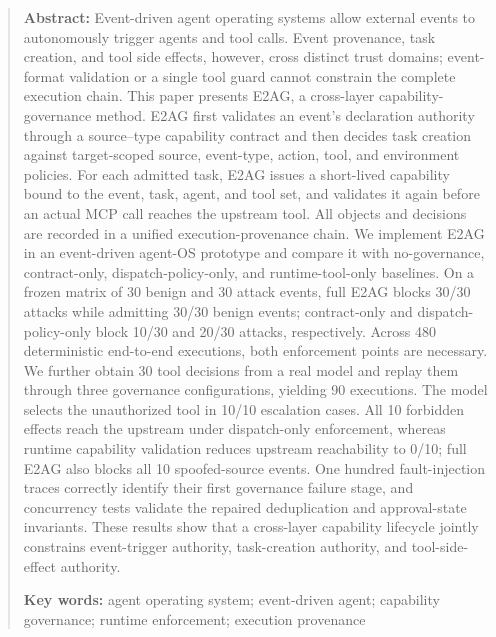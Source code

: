 \documentclass[UTF8,zihao=5,fontset=none]{ctexart}
\begin{document}
\begin{quote}\small
\textbf{Abstract:} Event-driven agent operating systems allow external events to autonomously trigger agents and tool calls. Event provenance, task creation, and tool side effects, however, cross distinct trust domains; event-format validation or a single tool guard cannot constrain the complete execution chain. This paper presents E2AG, a cross-layer capability-governance method. E2AG first validates an event's declaration authority through a source--type capability contract and then decides task creation against target-scoped source, event-type, action, tool, and environment policies. For each admitted task, E2AG issues a short-lived capability bound to the event, task, agent, and tool set, and validates it again before an actual MCP call reaches the upstream tool. All objects and decisions are recorded in a unified execution-provenance chain. We implement E2AG in an event-driven agent-OS prototype and compare it with no-governance, contract-only, dispatch-policy-only, and runtime-tool-only baselines. On a frozen matrix of 30 benign and 30 attack events, full E2AG blocks 30/30 attacks while admitting 30/30 benign events; contract-only and dispatch-policy-only block 10/30 and 20/30 attacks, respectively. Across 480 deterministic end-to-end executions, both enforcement points are necessary. We further obtain 30 tool decisions from a real model and replay them through three governance configurations, yielding 90 executions. The model selects the unauthorized tool in 10/10 escalation cases. All 10 forbidden effects reach the upstream under dispatch-only enforcement, whereas runtime capability validation reduces upstream reachability to 0/10; full E2AG also blocks all 10 spoofed-source events. One hundred fault-injection traces correctly identify their first governance failure stage, and concurrency tests validate the repaired deduplication and approval-state invariants. These results show that a cross-layer capability lifecycle jointly constrains event-trigger authority, task-creation authority, and tool-side-effect authority.

\textbf{Key words:} agent operating system; event-driven agent; capability governance; runtime enforcement; execution provenance
\end{quote}


\end{document}

